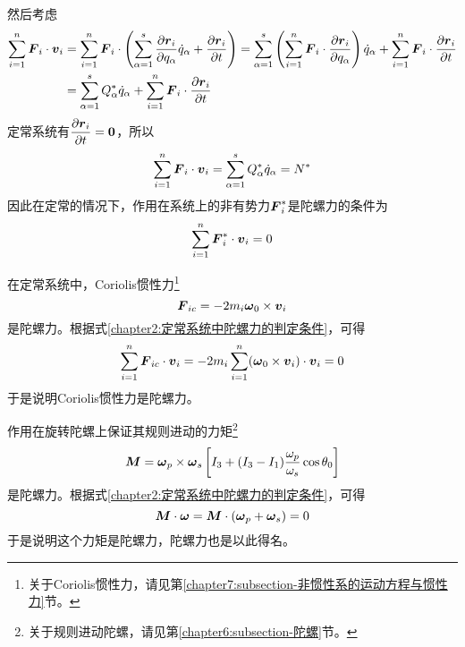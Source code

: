 然后考虑
\begin{align*}
	\sum_{i=1}^n \boldsymbol{F}_i\cdot \boldsymbol{v}_i & = \sum_{i=1}^n \boldsymbol{F}_i\cdot \left(\sum_{\alpha=1}^s \frac{\partial \boldsymbol{r}_i}{\partial q_\alpha} \dot{q}_\alpha + \frac{\partial \boldsymbol{r}_i}{\partial t}\right) = \sum_{\alpha=1}^s \left(\sum_{i=1}^n \boldsymbol{F}_i\cdot \frac{\partial \boldsymbol{r}_i}{\partial q_\alpha}\right) \dot{q}_\alpha + \sum_{i=1}^n \boldsymbol{F}_i\cdot \frac{\partial \boldsymbol{r}_i}{\partial t} \\
	& = \sum_{\alpha=1}^s Q_\alpha^* \dot{q}_\alpha + \sum_{i=1}^n \boldsymbol{F}_i\cdot \frac{\partial \boldsymbol{r}_i}{\partial t}
\end{align*}
定常系统有$\dfrac{\partial \boldsymbol{r}_i}{\partial t} = \boldsymbol{0}$，所以
\begin{equation*}
	\sum_{i=1}^n \boldsymbol{F}_i\cdot \boldsymbol{v}_i = \sum_{\alpha=1}^s Q_\alpha^* \dot{q}_\alpha = N^*
\end{equation*}
因此在定常的情况下，作用在系统上的非有势力$\boldsymbol{F}_i^*$是陀螺力的条件为
\begin{equation}
	\sum_{i=1}^n \boldsymbol{F}_i^*\cdot \boldsymbol{v}_i = 0
	\label{chapter2:定常系统中陀螺力的判定条件}
\end{equation}

\begin{example}
在定常系统中，Coriolis惯性力\footnote{关于Coriolis惯性力，请见第\ref{chapter7:subsection-非惯性系的运动方程与惯性力}节。}
\begin{equation*}
	\boldsymbol{F}_{ic} = -2m_i\boldsymbol{\omega}_0\times \boldsymbol{v}_i
\end{equation*}
是陀螺力。根据式\eqref{chapter2:定常系统中陀螺力的判定条件}，可得
\begin{equation*}
	\sum_{i=1}^n \boldsymbol{F}_{ic}\cdot \boldsymbol{v}_i = -2m_i\sum_{i=1}^n (\boldsymbol{\omega}_0\times \boldsymbol{v}_i)\cdot \boldsymbol{v}_i = 0
\end{equation*}
于是说明Coriolis惯性力是陀螺力。
\end{example}

\begin{example}
作用在旋转陀螺上保证其规则进动的力矩\footnote{关于规则进动陀螺，请见第\ref{chapter6:subsection-陀螺}节。}
\begin{equation*}
	\boldsymbol{M} = \boldsymbol{\omega}_p\times\boldsymbol{\omega}_s\left[I_3+(I_3-I_1)\dfrac{\omega_p}{\omega_s}\cos\theta_0\right]
\end{equation*}
是陀螺力。根据式\eqref{chapter2:定常系统中陀螺力的判定条件}，可得
\begin{equation*}
	\boldsymbol{M}\cdot \boldsymbol{\omega} = \boldsymbol{M}\cdot (\boldsymbol{\omega}_p+\boldsymbol{\omega}_s) = 0
\end{equation*}
于是说明这个力矩是陀螺力，陀螺力也是以此得名。
\end{example}

